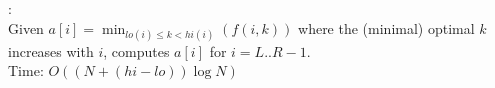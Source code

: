 :\\Given $a[i] = \min_{lo(i) \le k < hi(i)}(f(i, k))$ where the (minimal)
optimal $k$ increases with $i$, computes $a[i]$ for $i = L..R-1$.\\
Time: $O((N + (hi-lo)) \log N)$

